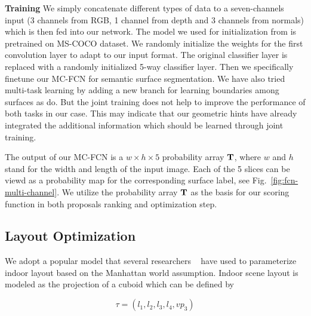\textbf{Training}
We simply concatenate different types of data to a seven-channels input (3 channels from RGB, 1 channel from depth and 3 channels from normals) which is then fed into our network. The model we used for initialization from \cite{chen2016deeplab} is pretrained on MS-COCO dataset. We randomly initialize the weights for the first convolution layer to adapt to our input format. The original classifier layer is replaced with a randomly initialized 5-way classifier layer. Then we specifically finetune our MC-FCN for semantic surface segmentation. We have also tried multi-task learning by adding a new branch for learning boundaries among surfaces as \cite{ren2016coarse, mallya2015learning} do. But the joint training does not help to improve the performance of both tasks in our case. This may indicate that our geometric hints have already integrated the additional information which should be learned through joint training.

The output of our MC-FCN is a $w\times h \times 5$ probability array $\mathbf{T}$, where $w$ and $h$ stand for the width and length of the input image. Each of the 5 slices can be viewd as a probability map for the corresponding surface label, see Fig.~\ref{fig:fcn-multi-channel}. We utilize the probability array $\mathbf{T}$ as the basis for our scoring function in both proposals ranking and optimization step. 


\subsection{Layout Optimization}
\label{sec:optimization}
We adopt a popular model that several researchers ~\cite{hedau2009recovering, wang2013discriminative, dasgupta2016delay, ren2016coarse} have used to parameterize indoor layout based on the Manhattan world assumption. 
Indoor scene layout is modeled as the projection of a cuboid which can be defined by 

\begin{equation}
	\label{eq:Layout}
	\tau = (l_1, l_2, l_3, l_4, vp_3)
\end{equation}

